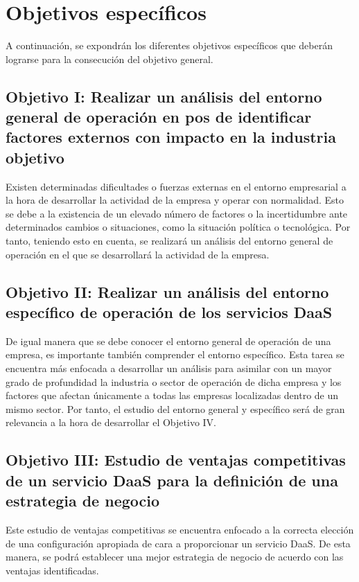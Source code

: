 \clearpage

\section{Objetivos específicos}
A continuación, se expondrán los diferentes objetivos específicos que deberán lograrse para la consecución del objetivo general.

\subsection{Objetivo I: Realizar un análisis del entorno general de operación en pos de identificar factores externos con impacto en la industria objetivo}
Existen determinadas dificultades o fuerzas externas en el entorno empresarial a la hora de desarrollar la actividad de la empresa y operar con normalidad. Esto se debe a la existencia de un elevado número de factores o la incertidumbre ante determinados cambios o situaciones, como la situación política o tecnológica. Por tanto, teniendo esto en cuenta, se realizará un análisis del entorno general de operación en el que se desarrollará la actividad de la empresa.

\subsection{Objetivo II: Realizar un análisis del entorno específico de operación de los servicios \acs{DaaS}}
De igual manera que se debe conocer el entorno general de operación de una empresa, es importante también comprender el entorno específico. Esta tarea se encuentra más enfocada a desarrollar un análisis para asimilar con un mayor grado de profundidad la industria o sector de operación de dicha empresa y los factores que afectan únicamente a todas las empresas localizadas dentro de un mismo sector. Por tanto, el estudio del entorno general y específico será de gran relevancia a la hora de desarrollar el Objetivo IV.

\subsection{Objetivo III: Estudio de ventajas competitivas de un servicio \acs{DaaS} para la definición de una estrategia de negocio}
Este estudio de ventajas competitivas se encuentra enfocado a la correcta elección de una configuración apropiada de cara a proporcionar un servicio \acs{DaaS}. De esta manera, se podrá establecer una mejor estrategia de negocio de acuerdo con las ventajas identificadas.

